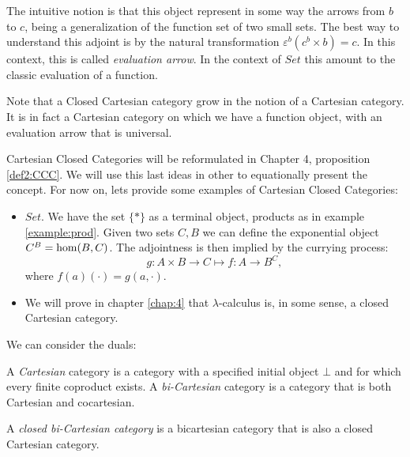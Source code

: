 \begin{definition}
\begin{itemize}
    The intuitive notion is that this object represent in some way the arrows from $b$ to $c$, being a generalization of the function set of two small sets. The best way to understand this adjoint is by the natural transformation $\varepsilon^b(c^b\times b) = c$. In this context, this is called \emph{evaluation arrow}. In the context of $Set$ this amount to the classic evaluation of a function.\\

  \end{itemize}
\end{definition}

\begin{remark}
  Note that a Closed Cartesian category grow in the notion of a Cartesian category. It is in fact a Cartesian category on which we have a function object, with an evaluation arrow that is universal.
\end{remark}

Cartesian Closed Categories will be reformulated in Chapter 4, proposition \ref{def2:CCC}. We will use this last ideas in other to equationally present the concept. For now on, lets provide some examples of Cartesian Closed Categories:




\begin{example}
  \begin{itemize}
  \item $Set$. We have the set $\{*\}$ as a terminal object, products as in example \ref{example:prod}. Given two sets $C, B$ we can define the exponential object $C^B= \operatorname{hom} (B,C)$. The adjointness is then implied by the currying process:
    $$g: A\times B \to C \mapsto f: A \to B^C,$$
    where $f(a)(\cdot) = g(a,\cdot)$.
  \item We will prove in chapter \ref{chap:4} that $\lambda$-calculus is, in some sense, a closed Cartesian category.
  \end{itemize}
\end{example}


We can consider the duals:

\begin{definition}
  A \emph{Cartesian} category is a category with a specified initial object $\bot$ and for which every finite coproduct exists. A \emph{bi-Cartesian} category is a category that is both Cartesian and cocartesian.
\end{definition}

\begin{definition}A \emph{closed bi-Cartesian category} is a bicartesian category that is also a closed Cartesian category.
\end{definition}

